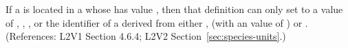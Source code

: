 If a \Species is located in a \Compartment whose 
has value , then that \Species definition can only set
 to a value of , ,
, or the identifier of a \UnitDefinition derived from
either ,  (with an  value of
) or .  (References: L2V1 Section 4.6.4; L2V2
Section~\ref{sec:species-units}.)
